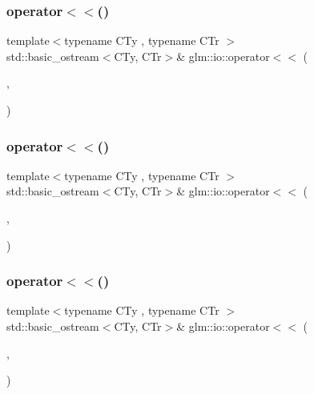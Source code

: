 \subsubsection{\texorpdfstring{operator$<$$<$()}{operator<<()}\hspace{0.1cm}{\footnotesize\ttfamily [5/8]}}
{\footnotesize\ttfamily template$<$typename C\+Ty , typename C\+Tr $>$ \\
std\+::basic\+\_\+ostream$<$C\+Ty, C\+Tr$>$\& glm\+::io\+::operator$<$$<$ (\begin{DoxyParamCaption}\item[{std\+::basic\+\_\+ostream$<$ C\+Ty, C\+Tr $>$ \&}]{,  }\item[{\mbox{\hyperlink{structglm_1_1io_1_1delimeter}{delimeter}}$<$ C\+Ty $>$ const \&}]{ }\end{DoxyParamCaption})}

\mbox{\label{namespaceglm_1_1io_aa5761ee427320d2121a97a7450256e3b}} 
\subsubsection{\texorpdfstring{operator$<$$<$()}{operator<<()}\hspace{0.1cm}{\footnotesize\ttfamily [6/8]}}
{\footnotesize\ttfamily template$<$typename C\+Ty , typename C\+Tr $>$ \\
std\+::basic\+\_\+ostream$<$C\+Ty, C\+Tr$>$\& glm\+::io\+::operator$<$$<$ (\begin{DoxyParamCaption}\item[{std\+::basic\+\_\+ostream$<$ C\+Ty, C\+Tr $>$ \&}]{,  }\item[{\mbox{\hyperlink{structglm_1_1io_1_1precision}{precision}} const \&}]{ }\end{DoxyParamCaption})}

\mbox{\label{namespaceglm_1_1io_a61e151e99a1d05cb604f0bede66996be}} 
\subsubsection{\texorpdfstring{operator$<$$<$()}{operator<<()}\hspace{0.1cm}{\footnotesize\ttfamily [7/8]}}
{\footnotesize\ttfamily template$<$typename C\+Ty , typename C\+Tr $>$ \\
std\+::basic\+\_\+ostream$<$C\+Ty, C\+Tr$>$\& glm\+::io\+::operator$<$$<$ (\begin{DoxyParamCaption}\item[{std\+::basic\+\_\+ostream$<$ C\+Ty, C\+Tr $>$ \&}]{,  }\item[{\mbox{\hyperlink{structglm_1_1io_1_1width}{width}} const \&}]{ }\end{DoxyParamCaption})}

